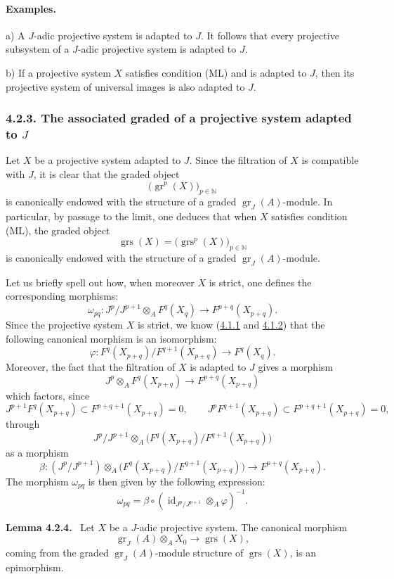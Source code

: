 \documentclass[11pt]{article}
\newenvironment{statement}[1]{\par\medskip\noindent\textbf{#1.}\ }{\par\medskip}
\providecommand{\gr}{\operatorname{gr}}
\providecommand{\id}{\operatorname{id}}
\providecommand{\id}{\operatorname{id}}
\providecommand{\gr}{\operatorname{gr}}
\providecommand{\gr}{\operatorname{gr}}
\providecommand{\grs}{\operatorname{grs}}
\providecommand{\id}{\operatorname{id}}
\providecommand{\id}{\operatorname{id}}
\providecommand{\id}{\operatorname{id}}
\providecommand{\id}{\operatorname{id}}
\begin{document}
\paragraph{Examples.}
a) A \(J\)-adic projective system is adapted to \(J\). It follows that every projective subsystem of a \(J\)-adic projective system is adapted to \(J\).

b) If a projective system \(X\) satisfies condition (ML) and is adapted to \(J\), then its projective system of universal images is also adapted to \(J\).

\subsubsection*{4.2.3. The associated graded of a projective system adapted to \(J\)}\label{sga5:V:subsubsection:4.2.3}
Let \(X\) be a projective system adapted to \(J\). Since the filtration of \(X\) is compatible with \(J\), it is clear that the graded object
\[
\bigl(\gr^p(X)\bigr)_{p\in\mathbb N}
\]
is canonically endowed with the structure of a graded \(\gr_J(A)\)-module. In particular, by passage to the limit, one deduces that when \(X\) satisfies condition (ML), the graded object
\[
\grs(X)=\bigl(\grs^p(X)\bigr)_{p\in\mathbb N}
\]
is canonically endowed with the structure of a graded \(\gr_J(A)\)-module.

Let us briefly spell out how, when moreover \(X\) is strict, one defines the corresponding morphisms:
\[
\omega_{pq}: J^p/J^{p+1}\otimes_A F^q(X_q)\longrightarrow F^{p+q}(X_{p+q}).
\]
Since the projective system \(X\) is strict, we know (\hyperref[sga5:V:subsubsection:4.1.1]{4.1.1} and \hyperref[sga5:V:definition:4.1.2]{4.1.2}) that the following canonical morphism is an isomorphism:
\[
\varphi:F^q(X_{p+q})/F^{q+1}(X_{p+q})\longrightarrow F^q(X_q).
\]
Moreover, the fact that the filtration of \(X\) is adapted to \(J\) gives a morphism
\[
J^p\otimes_A F^q(X_{p+q})\longrightarrow F^{p+q}(X_{p+q})
\]
which factors, since
\[
J^{p+1}F^q(X_{p+q})\subset F^{p+q+1}(X_{p+q})=0,\qquad
J^pF^{q+1}(X_{p+q})\subset F^{p+q+1}(X_{p+q})=0,
\]
through
\[
J^p/J^{p+1}\otimes_A
\bigl(F^q(X_{p+q})/F^{q+1}(X_{p+q})\bigr)
\]
as a morphism
\[
\beta:(J^p/J^{p+1})\otimes_A
\bigl(F^q(X_{p+q})/F^{q+1}(X_{p+q})\bigr)
\longrightarrow F^{p+q}(X_{p+q}).
\]
The morphism \(\omega_{pq}\) is then given by the following expression:
\[
\omega_{pq}=\beta\circ(\id_{J^p/J^{p+1}}\otimes_A\varphi)^{-1}.
\]

\label{sga5:V:lemma:4.2.4}\begin{statement}{Lemma 4.2.4}
Let \(X\) be a \(J\)-adic projective system. The canonical morphism
\[
\gr_J(A)\otimes_A X_0\longrightarrow \grs(X),
\]
coming from the graded \(\gr_J(A)\)-module structure of \(\grs(X)\), is an epimorphism.
\end{statement}
\end{document}

